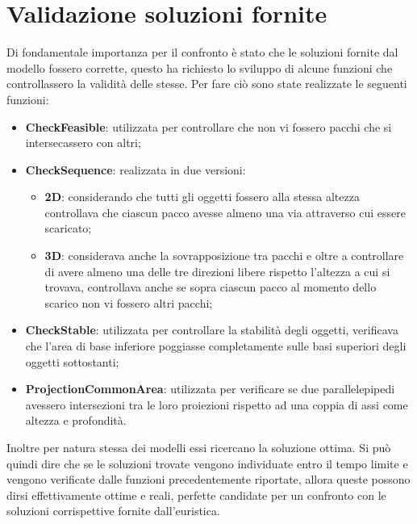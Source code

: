 \section{Validazione soluzioni fornite}
Di fondamentale importanza per il confronto è stato che le soluzioni fornite dal modello fossero corrette, questo ha richiesto lo sviluppo di alcune funzioni che controllassero la validità delle stesse. Per fare ciò sono state realizzate le seguenti funzioni:
\begin{itemize}
	\item \textbf{CheckFeasible}: utilizzata per controllare che non vi fossero pacchi che si intersecassero con altri;
	\item \textbf{CheckSequence}: realizzata in due versioni:
	      \begin{itemize}
	      	\item \textbf{2D}: considerando che tutti gli oggetti fossero alla stessa altezza controllava che ciascun pacco avesse almeno una via attraverso cui essere scaricato;
	      	\item \textbf{3D}: considerava anche la sovrapposizione tra pacchi e oltre a controllare di avere almeno una delle tre direzioni libere rispetto l'altezza a cui si trovava, controllava anche se sopra ciascun pacco al momento dello scarico non vi fossero altri pacchi;
	      \end{itemize}
	\item \textbf{CheckStable}: utilizzata per controllare la stabilità degli oggetti, verificava che l'area di base inferiore poggiasse completamente sulle basi superiori degli oggetti sottostanti;
	\item \textbf{ProjectionCommonArea}: utilizzata per verificare se due parallelepipedi avessero intersezioni tra le loro proiezioni rispetto ad una coppia di assi come altezza e profondità.
\end{itemize}

Inoltre per natura stessa dei modelli essi ricercano la soluzione ottima. Si può quindi dire che se le soluzioni trovate vengono individuate entro il tempo limite e vengono verificate dalle funzioni precedentemente riportate, allora queste possono dirsi effettivamente ottime e reali, perfette candidate per un confronto con le soluzioni corrispettive fornite dall'euristica.